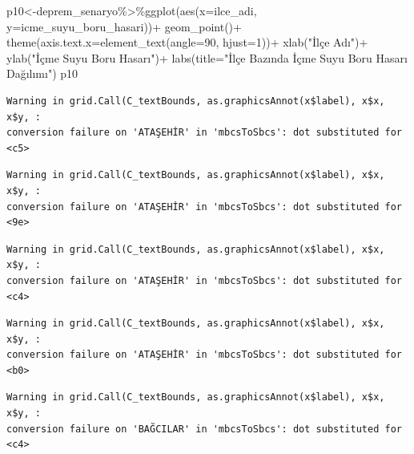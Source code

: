 \documentclass[
  11pt,
  a4paper,
  DIV=11,
  numbers=noendperiod]{scrartcl}
\newenvironment{Shaded}{\begin{snugshade}}{\end{snugshade}}
\newcommand{\AttributeTok}[1]{\textcolor[rgb]{0.40,0.45,0.13}{#1}}
\newcommand{\DecValTok}[1]{\textcolor[rgb]{0.68,0.00,0.00}{#1}}
\newcommand{\FunctionTok}[1]{\textcolor[rgb]{0.28,0.35,0.67}{#1}}
\newcommand{\NormalTok}[1]{\textcolor[rgb]{0.00,0.23,0.31}{#1}}
\newcommand{\OtherTok}[1]{\textcolor[rgb]{0.00,0.23,0.31}{#1}}
\newcommand{\SpecialCharTok}[1]{\textcolor[rgb]{0.37,0.37,0.37}{#1}}
\newcommand{\StringTok}[1]{\textcolor[rgb]{0.13,0.47,0.30}{#1}}
\begin{document}
\begin{Shaded}
\begin{Highlighting}[]
\NormalTok{p10}\OtherTok{\textless{}{-}}\NormalTok{deprem\_senaryo}\SpecialCharTok{\%\textgreater{}\%}\FunctionTok{ggplot}\NormalTok{(}\FunctionTok{aes}\NormalTok{(}\AttributeTok{x=}\NormalTok{ilce\_adi, }\AttributeTok{y=}\NormalTok{icme\_suyu\_boru\_hasari))}\SpecialCharTok{+}
  \FunctionTok{geom\_point}\NormalTok{()}\SpecialCharTok{+}
  \FunctionTok{theme}\NormalTok{(}\AttributeTok{axis.text.x=}\FunctionTok{element\_text}\NormalTok{(}\AttributeTok{angle=}\DecValTok{90}\NormalTok{, }\AttributeTok{hjust=}\DecValTok{1}\NormalTok{))}\SpecialCharTok{+}
  \FunctionTok{xlab}\NormalTok{(}\StringTok{"İlçe Adı"}\NormalTok{)}\SpecialCharTok{+}
  \FunctionTok{ylab}\NormalTok{(}\StringTok{"İçme Suyu Boru Hasarı"}\NormalTok{)}\SpecialCharTok{+}
  \FunctionTok{labs}\NormalTok{(}\AttributeTok{title=}\StringTok{"İlçe Bazında İçme Suyu Boru Hasarı Dağılımı"}\NormalTok{)}
\NormalTok{p10}
\end{Highlighting}
\end{Shaded}

\begin{verbatim}
Warning in grid.Call(C_textBounds, as.graphicsAnnot(x$label), x$x, x$y, :
conversion failure on 'ATAŞEHİR' in 'mbcsToSbcs': dot substituted for <c5>
\end{verbatim}

\begin{verbatim}
Warning in grid.Call(C_textBounds, as.graphicsAnnot(x$label), x$x, x$y, :
conversion failure on 'ATAŞEHİR' in 'mbcsToSbcs': dot substituted for <9e>
\end{verbatim}

\begin{verbatim}
Warning in grid.Call(C_textBounds, as.graphicsAnnot(x$label), x$x, x$y, :
conversion failure on 'ATAŞEHİR' in 'mbcsToSbcs': dot substituted for <c4>
\end{verbatim}

\begin{verbatim}
Warning in grid.Call(C_textBounds, as.graphicsAnnot(x$label), x$x, x$y, :
conversion failure on 'ATAŞEHİR' in 'mbcsToSbcs': dot substituted for <b0>
\end{verbatim}

\begin{verbatim}
Warning in grid.Call(C_textBounds, as.graphicsAnnot(x$label), x$x, x$y, :
conversion failure on 'BAĞCILAR' in 'mbcsToSbcs': dot substituted for <c4>
\end{verbatim}
\end{document}
